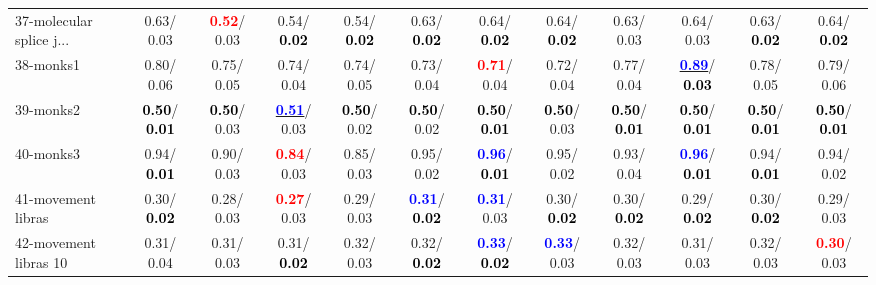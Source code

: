 \begin{table}[h]
\begin{center}
{\begin{tabular}{lc|c|c|c|c|c|c|c|c|c|c}
37-molecular splice j... &   0.63/  0.03 & \textcolor{red}{\textbf{  0.52}}/  0.03 &   0.54/\textcolor{black}{\textbf{  0.02}} &   0.54/\textcolor{black}{\textbf{  0.02}} &   0.63/\textcolor{black}{\textbf{  0.02}} &   0.64/\textcolor{black}{\textbf{  0.02}} &   0.64/\textcolor{black}{\textbf{  0.02}} &   0.63/  0.03 &   0.64/  0.03 &   0.63/\textcolor{black}{\textbf{  0.02}} &   0.64/\textcolor{black}{\textbf{  0.02}} \\
38-monks1 &   0.80/  0.06 &   0.75/  0.05 &   0.74/  0.04 &   0.74/  0.05 &   0.73/  0.04 & \textcolor{red}{\textbf{  0.71}}/  0.04 &   0.72/  0.04 &   0.77/  0.04 & \underline{\textcolor{blue}{\textbf{  0.89}}}/\textcolor{black}{\textbf{  0.03}} &   0.78/  0.05 &   0.79/  0.06 \\
39-monks2 & \textcolor{black}{\textbf{  0.50}}/\textcolor{black}{\textbf{  0.01}} & \textcolor{black}{\textbf{  0.50}}/  0.03 & \underline{\textcolor{blue}{\textbf{  0.51}}}/  0.03 & \textcolor{black}{\textbf{  0.50}}/  0.02 & \textcolor{black}{\textbf{  0.50}}/  0.02 & \textcolor{black}{\textbf{  0.50}}/\textcolor{black}{\textbf{  0.01}} & \textcolor{black}{\textbf{  0.50}}/  0.03 & \textcolor{black}{\textbf{  0.50}}/\textcolor{black}{\textbf{  0.01}} & \textcolor{black}{\textbf{  0.50}}/\textcolor{black}{\textbf{  0.01}} & \textcolor{black}{\textbf{  0.50}}/\textcolor{black}{\textbf{  0.01}} & \textcolor{black}{\textbf{  0.50}}/\textcolor{black}{\textbf{  0.01}} \\ \hline
40-monks3 &   0.94/\textcolor{black}{\textbf{  0.01}} &   0.90/  0.03 & \textcolor{red}{\textbf{  0.84}}/  0.03 &   0.85/  0.03 &   0.95/  0.02 & \textcolor{blue}{\textbf{  0.96}}/\textcolor{black}{\textbf{  0.01}} &   0.95/  0.02 &   0.93/  0.04 & \textcolor{blue}{\textbf{  0.96}}/\textcolor{black}{\textbf{  0.01}} &   0.94/\textcolor{black}{\textbf{  0.01}} &   0.94/  0.02 \\
41-movement libras &   0.30/\textcolor{black}{\textbf{  0.02}} &   0.28/  0.03 & \textcolor{red}{\textbf{  0.27}}/  0.03 &   0.29/  0.03 & \textcolor{blue}{\textbf{  0.31}}/\textcolor{black}{\textbf{  0.02}} & \textcolor{blue}{\textbf{  0.31}}/  0.03 &   0.30/\textcolor{black}{\textbf{  0.02}} &   0.30/\textcolor{black}{\textbf{  0.02}} &   0.29/\textcolor{black}{\textbf{  0.02}} &   0.30/\textcolor{black}{\textbf{  0.02}} &   0.29/  0.03 \\
42-movement libras 10 &   0.31/  0.04 &   0.31/  0.03 &   0.31/\textcolor{black}{\textbf{  0.02}} &   0.32/  0.03 &   0.32/\textcolor{black}{\textbf{  0.02}} & \textcolor{blue}{\textbf{  0.33}}/\textcolor{black}{\textbf{  0.02}} & \textcolor{blue}{\textbf{  0.33}}/  0.03 &   0.32/  0.03 &   0.31/  0.03 &   0.32/  0.03 & \textcolor{red}{\textbf{  0.30}}/  0.03 \\

\end{tabular}}
\end{center}
\end{table}
